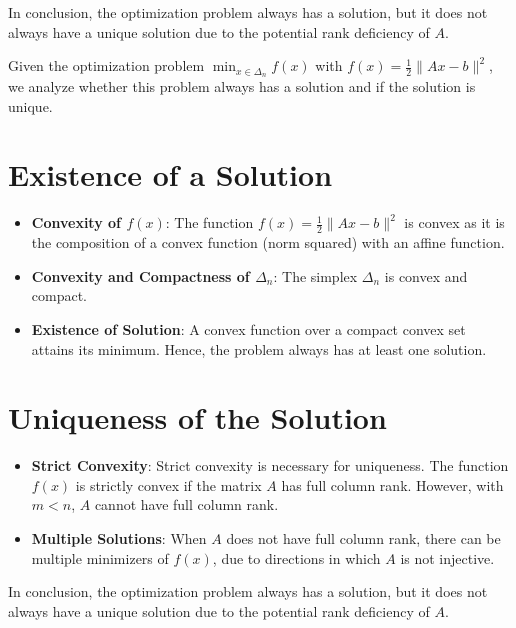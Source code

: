 \documentclass[12p]{article}
\begin{document}
In conclusion, the optimization problem always has a solution, but it does not always have a unique solution due to the potential rank deficiency of \( A \).

















Given the optimization problem \( \min_{x \in \Delta_n} f(x) \) with \( f(x) = \frac{1}{2} \|Ax - b\|^2 \), we analyze whether this problem always has a solution and if the solution is unique.

\section*{Existence of a Solution}
\begin{itemize}
    \item \textbf{Convexity of \( f(x) \)}: The function \( f(x) = \frac{1}{2} \|Ax - b\|^2 \) is convex as it is the composition of a convex function (norm squared) with an affine function.
    \item \textbf{Convexity and Compactness of \( \Delta_n \)}: The simplex \( \Delta_n \) is convex and compact.
    \item \textbf{Existence of Solution}: A convex function over a compact convex set attains its minimum. Hence, the problem always has at least one solution.
\end{itemize}

\section*{Uniqueness of the Solution}
\begin{itemize}
    \item \textbf{Strict Convexity}: Strict convexity is necessary for uniqueness. The function \( f(x) \) is strictly convex if the matrix \( A \) has full column rank. However, with \( m < n \), \( A \) cannot have full column rank.
    \item \textbf{Multiple Solutions}: When \( A \) does not have full column rank, there can be multiple minimizers of \( f(x) \), due to directions in which \( A \) is not injective.
\end{itemize}

In conclusion, the optimization problem always has a solution, but it does not always have a unique solution due to the potential rank deficiency of \( A \).
\end{document}
